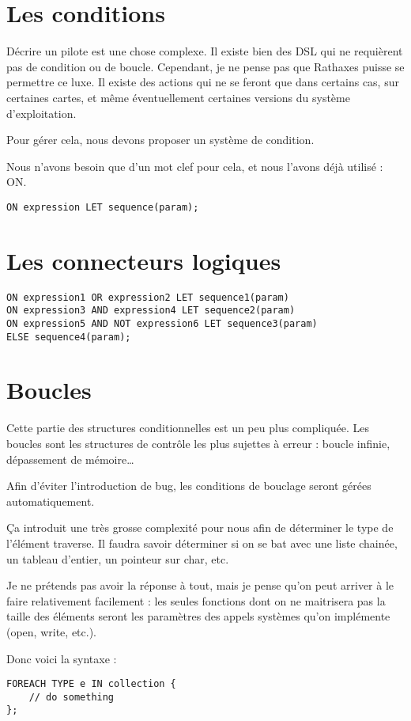 \documentclass[french]{rtxreport}
\begin{document}
\section{Les conditions}
Décrire un pilote est une chose complexe. Il existe bien des DSL qui ne requièrent pas de condition ou de boucle. Cependant, je ne pense pas que Rathaxes puisse se permettre ce luxe. Il existe des actions qui ne se feront que dans certains cas, sur certaines cartes, et même éventuellement certaines versions du système d’exploitation.

Pour gérer cela, nous devons proposer un système de condition. 

Nous n’avons besoin que d’un mot clef pour cela, et nous l’avons déjà utilisé : ON.
\begin{lstlisting}
ON expression LET sequence(param);
\end{lstlisting}

\section{Les connecteurs logiques}
\begin{lstlisting}
ON expression1 OR expression2 LET sequence1(param)
ON expression3 AND expression4 LET sequence2(param)
ON expression5 AND NOT expression6 LET sequence3(param)
ELSE sequence4(param);
\end{lstlisting}

\section{Boucles}
Cette partie des structures conditionnelles est un peu plus compliquée. Les boucles sont les structures de contrôle les plus sujettes à erreur : boucle infinie, dépassement de mémoire\ldots

Afin d’éviter l’introduction de bug, les conditions de bouclage seront gérées automatiquement.

Ça introduit une très grosse complexité pour nous afin de déterminer le type de l’élément traverse. Il faudra savoir déterminer si on se bat avec une liste chainée, un tableau d’entier, un pointeur sur char, etc.

Je ne prétends pas avoir la réponse à tout, mais je pense qu’on peut arriver à le faire relativement facilement : les seules fonctions dont on ne maitrisera pas la taille des éléments seront les paramètres des appels systèmes qu’on implémente (open, write, etc.).

Donc voici la syntaxe :
\begin{lstlisting}
FOREACH TYPE e IN collection {
	// do something
};
\end{lstlisting}
\end{document}
